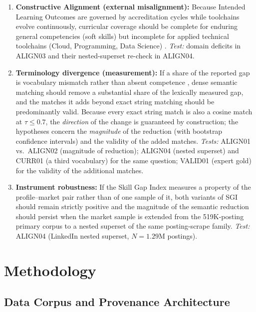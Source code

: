 \documentclass[journal]{IEEEtran}
\begin{document}
\begin{enumerate}[label=\textbf{H\arabic*:}]
    \item \textbf{Constructive Alignment (external misalignment):} Because Intended Learning Outcomes are governed by accreditation cycles while toolchains evolve continuously, curricular coverage should be complete for enduring general competencies (soft skills) but incomplete for applied technical toolchains (Cloud, Programming, Data Science) \cite{biggs1996enhancing}. \textit{Test:} domain deficits in ALIGN03 and their nested-superset re-check in ALIGN04.
    \item \textbf{Terminology divergence (measurement):} If a share of the reported gap is vocabulary mismatch rather than absent competence \cite{kruger2025improving}, dense semantic matching should remove a substantial share of the lexically measured gap, and the matches it adds beyond exact string matching should be predominantly valid. Because every exact string match is also a cosine match at $\tau \le 0.7$, the \emph{direction} of the change is guaranteed by construction; the hypotheses concern the \emph{magnitude} of the reduction (with bootstrap confidence intervals) and the validity of the added matches. \textit{Tests:} ALIGN01 vs.\ ALIGN02 (magnitude of reduction); ALIGN04 (nested superset) and CURR01 (a third vocabulary) for the same question; VALID01 (expert gold) for the validity of the additional matches.
    \item \textbf{Instrument robustness:} If the Skill Gap Index measures a property of the profile--market pair rather than of one sample of it, both variants of SGI should remain strictly positive and the magnitude of the semantic reduction should persist when the market sample is extended from the 519K-posting primary corpus to a nested superset of the same posting-scrape family. \textit{Test:} ALIGN04 (LinkedIn nested superset, $N = 1.29$M postings).
\end{enumerate}

\section{Methodology}
\label{sec:methodology}

\subsection{Data Corpus and Provenance Architecture}
\end{document}
